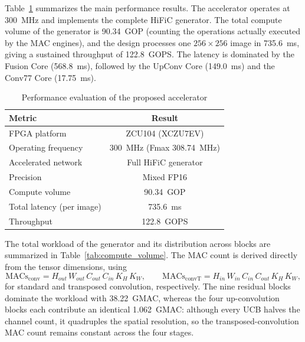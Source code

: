 Table~\ref{tab:performance_evaluation} summarizes the main performance results. The accelerator operates at 300~MHz and implements the complete HiFiC generator. The total compute volume of the generator is 90.34~GOP (counting the operations actually executed by the MAC engines), and the design processes one $256\times256$ image in 735.6~ms, giving a sustained throughput of 122.8~GOPS. The latency is dominated by the Fusion Core (568.8~ms), followed by the UpConv Core (149.0~ms) and the Conv77 Core (17.75~ms).

\begin{table}[H]
    \centering
    \caption{Performance evaluation of the proposed accelerator}
    \label{tab:performance_evaluation}
    \begin{tabular}{|l|c|}
        \hline
        \textbf{Metric} & \textbf{Result} \\
        \hline
        FPGA platform & ZCU104 (XCZU7EV) \\
        \hline
        Operating frequency & 300~MHz (Fmax 308.74~MHz) \\
        \hline
        Accelerated network & Full HiFiC generator \\
        \hline
        Precision & Mixed FP16 \\
        \hline
        Compute volume & 90.34~GOP \\
        \hline
        Total latency (per image) & 735.6~ms \\
        \hline
        Throughput & 122.8~GOPS \\
        \hline
    \end{tabular}
\end{table}

The total workload of the generator and its distribution across blocks are summarized in Table~\ref{tab:compute_volume}. The MAC count is derived directly from the tensor dimensions, using
\[
\text{MACs}_{\text{conv}} = H_{out}\,W_{out}\,C_{out}\,C_{in}\,K_H\,K_W,
\qquad
\text{MACs}_{\text{convT}} = H_{in}\,W_{in}\,C_{in}\,C_{out}\,K_H\,K_W,
\]
for standard and transposed convolution, respectively. The nine residual blocks dominate the workload with 38.22~GMAC, whereas the four up-convolution blocks each contribute an identical 1.062~GMAC: although every UCB halves the channel count, it quadruples the spatial resolution, so the transposed-convolution MAC count remains constant across the four stages.


